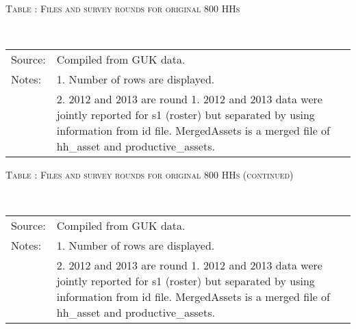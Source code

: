 \begin{table}
\hfil\textsc{\footnotesize Table \thetable: Files and survey rounds for original 800 HHs\label{filestab o800}}\\
\setlength{\tabcolsep}{1pt}
\renewcommand{\arraystretch}{.75}
\hfil{}\\
\renewcommand{\arraystretch}{1}
\hfil\begin{tabular}{>{\hfill\scriptsize}p{1cm}<{}>{\scriptsize}p{12cm}<{\hfill}}
Source:& Compiled from GUK data.\\[-1ex]
Notes:& 1. Number of rows are displayed.\\[-1ex]
& 2. 2012 and 2013 are round 1. 2012 and 2013 data were jointly reported for \textsf{s1 (roster)} but separated by using information from \textsf{id} file. \textsf{MergedAssets} is a merged file of \textsf{hh\_asset} and \textsf{productive\_assets}. \\[-1ex]
\end{tabular}
\end{table}

\begin{table}
\hfil\textsc{\footnotesize Table \thetable: Files and survey rounds for original 800 HHs (continued)\label{filestab o800 continued}}\\
\setlength{\tabcolsep}{1pt}
\renewcommand{\arraystretch}{.75}
\hfil{}\\
\renewcommand{\arraystretch}{1}
\hfil\begin{tabular}{>{\hfill\scriptsize}p{1cm}<{}>{\scriptsize}p{12cm}<{\hfill}}
Source:& Compiled from GUK data.\\[-1ex]
Notes:& 1. Number of rows are displayed.\\[-1ex]
& 2. 2012 and 2013 are round 1. 2012 and 2013 data were jointly reported for \textsf{s1 (roster)} but separated by using information from \textsf{id} file. \textsf{MergedAssets} is a merged file of \textsf{hh\_asset} and \textsf{productive\_assets}. \\[-1ex]
\end{tabular}
\end{table}


